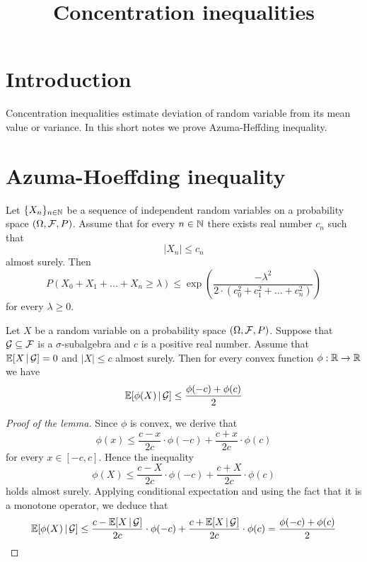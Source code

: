 



\title{Concentration inequalities}
\date{}
\maketitle

\section{Introduction}
\noindent
Concentration inequalities estimate deviation of random variable from its mean value or variance. In this short notes we prove Azuma-Heffding inequality. 

\section{Azuma-Hoeffding inequality}

\begin{theorem}\label{theorem:Azuma'ainequality}
Let $\{X_n\}_{n\in {\mathbb N}}$ be a sequence of independent random variables on a probability space $\left(\Omega, {\mathcal F},P\right)$. Assume that for every $n\in {\mathbb N}$ there exists real number $c_n$ such that 
$$|X_n|\leq c_n$$
almost surely. Then 
$$P\left(X_0+X_1+...+X_n\geq \lambda\right)\leq \exp\left(\frac{-\lambda^2}{2\cdot \left(c_0^2+c_1^2+...+c^2_n\right)}\right)$$
for every $\lambda \geq 0$.
\end{theorem}

\begin{lemma}\label{lemma:betterJensen}
Let $X$ be a random variable on a probability space $\left(\Omega, {\mathcal F}, P\right)$. Suppose that ${\mathcal G}\subseteq {\mathcal F}$ is a $\sigma$-subalgebra and $c$ is a positive real number. Assume that ${\mathbb E}[X\,|\,{\mathcal G}]=0$ and $|X|\leq c$ almost surely. Then for every convex function $\phi:{\mathbb R}\rightarrow {\mathbb R}$ we have
$${\mathbb E} [\phi(X)\,|\,{\mathcal G}]\leq \frac{\phi(-c)+\phi(c)}{2}$$
\end{lemma}
\begin{proof}[Proof of the lemma]
Since $\phi$ is convex, we derive that
$$\phi(x) \leq \frac{c-x}{2c}\cdot \phi(-c)+\frac{c+x}{2c}\cdot \phi(c)$$
for every $x\in [-c,c]$. Hence the inequality
$$\phi(X)\leq \frac{c-X}{2c}\cdot \phi(-c)+\frac{c+X}{2c}\cdot \phi(c)$$
holds almost surely. Applying conditional expectation and using the fact that it is a monotone operator, we deduce that 
$${\mathbb E} [\phi(X)\,|\,{\mathcal G}] \leq \frac{c-{\mathbb E}[X\,|\,{\mathcal G}]}{2c}\cdot \phi(-c)+\frac{c+{\mathbb E}[X\,|\,{\mathcal G}]}{2c}\cdot \phi(c)=\frac{\phi(-c)+\phi(c)}{2}$$
\end{proof}

